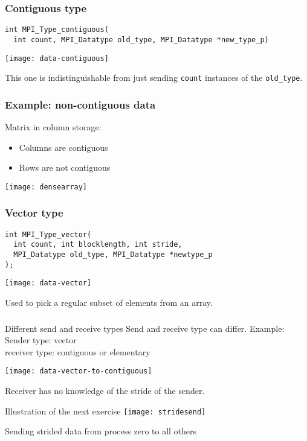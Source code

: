 \begin{frame}[containsverbatim]\frametitle{Contiguous type}
\lstset{language=C}
\begin{lstlisting}
int MPI_Type_contiguous(
  int count, MPI_Datatype old_type, MPI_Datatype *new_type_p)  
\end{lstlisting}
  \texttt{[image: data-contiguous]}

This one is indistinguishable from just sending \lstinline{count} instances
of the \lstinline{old_type}.
\end{frame}

\begin{frame}[containsverbatim]\frametitle{Example: non-contiguous data}
  Matrix in column storage:
  \begin{itemize}
  \item Columns are contiguous
  \item Rows are not contiguous
  \end{itemize}
  \texttt{[image: densearray]}
\end{frame}

\begin{frame}[containsverbatim]\frametitle{Vector type}
\begin{lstlisting}
int MPI_Type_vector(
  int count, int blocklength, int stride,
  MPI_Datatype old_type, MPI_Datatype *newtype_p
);  
\end{lstlisting}
  \texttt{[image: data-vector]}

Used to pick a regular subset of elements from an array.
\end{frame}

\begin{frame}[containsverbatim]\frametitle{}
\end{frame}

\begin{frame}{Different send and receive types}
  Send and receive type can differ. Example:\\
  Sender type: vector\\ receiver type: contiguous or elementary

  \texttt{[image: data-vector-to-contiguous]}

  Receiver has no knowledge of the stride of the sender.
\end{frame}

\begin{frame}{Illustration of the next exercise}
  \label{fig:stridesend}
  \texttt{[image: stridesend]}

  Sending strided data from process zero to all others
\end{frame}

